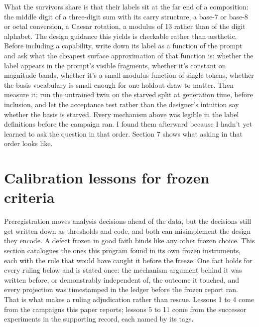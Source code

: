 What the survivors share is that their labels sit at the far end of a
composition: the middle digit of a three-digit sum with its carry
structure, a base-7 or base-8 or octal conversion, a Caesar rotation, a
modulus of 13 rather than of the digit alphabet. The design guidance
this yields is checkable rather than aesthetic. Before including a
capability, write down its label as a function of the prompt and ask
what the cheapest surface approximation of that function is: whether the
label appears in the prompt's visible fragments, whether it's constant
on magnitude bands, whether it's a small-modulus function of single
tokens, whether the basis vocabulary is small enough for one holdout
draw to matter. Then measure it: run the untrained twin on the starved
split at generation time, before inclusion, and let the acceptance test
rather than the designer's intuition say whether the basis is starved.
Every mechanism above was legible in the label definitions before the
campaign ran. I found them afterward because I hadn't yet learned to
ask the question in that order. Section 7 shows what asking in that
order looks like.

\section{Calibration lessons for frozen criteria}\label{calibration-lessons-for-frozen-criteria}

Preregistration moves analysis decisions ahead of the data, but the
decisions still get written down as thresholds and code, and both can
misimplement the design they encode. A defect frozen in good faith
binds like any other frozen choice. This section catalogues the ones
this program found in its own frozen instruments, each with the rule
that would have caught it before the freeze. One fact holds for every
ruling below and is stated once: the mechanism argument behind it was
written before, or demonstrably independent of, the outcome it
touched, and every projection was timestamped in the ledger before the
frozen report ran. That is what makes a ruling adjudication rather
than rescue. Lessons 1 to 4 come from the campaigns this paper
reports; lessons 5 to 11 come from the successor experiments in the
supporting record, each named by its tags.

